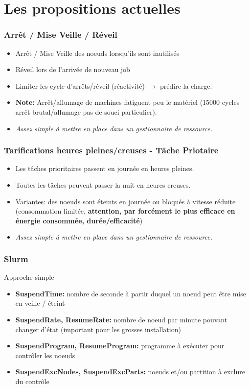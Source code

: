 \documentclass{beamer}
\begin{document}
\section{Les propositions actuelles}

\begin{frame}
  \frametitle{Arrêt / Mise Veille / Réveil}
  \begin{itemize}
		\item Arrêt / Mise Veille des noeuds lorsqu'ils sont inutilisés
    \item Réveil lors de l'arrivée de nouveau job
    \item Limiter les cycle d'arrêts/réveil (réactivité) $\rightarrow$ prédire la charge.
    \item {\bf Note:} Arrêt/allumage de machines fatiguent peu le matériel (15000 cycles arrêt brutal/allumage pas de souci particulier).
    \item {\em Assez simple à mettre en place dans un gestionnaire de ressource.}
 
  \end{itemize}
\end{frame}

\begin{frame}
  \frametitle{Tarifications heures pleines/creuses - Tâche Priotaire }
  \begin{itemize}
		\item Les tâches prioritaires passent en journée en heures pleines.
    \item Toutes les tâches peuvent passer la nuit en heures creuses.
    \item Variantes: des noeuds sont éteints en journée ou bloqués à vitesse réduite (consommation limitée, {\bf attention, par forcément le plus efficace en énergie consommée, durée/efficacité})
    \item {\em Assez simple à mettre en place dans un gestionnaire de ressource.}
 

   \end{itemize}
\end{frame}


\begin{frame}
  \frametitle{Slurm}
  Approche simple
  \begin{itemize}
		\item {\bf SuspendTime:} nombre de seconde à partir duquel un noeud peut être mise en veille / éteint 
    \item {\bf SuspendRate, ResumeRate:} nombre de noeud par minute pouvant changer d'état (important pour les grosses installation) 
    \item {\bf SuspendProgram, ResumeProgram:} programme à exécuter pour contrôler les noeuds
    \item {\bf SuspendExcNodes, SuspendExcParts:} noeuds et/ou partition à exclure du contrôle
  \end{itemize}
\end{frame}
\end{document}
